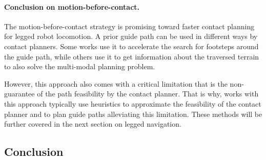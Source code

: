 \paragraph{Conclusion on motion-before-contact.}

The motion-before-contact strategy is promising toward faster contact planning for legged robot locomotion.
A prior guide path can be used in different ways by contact planners. 
Some works use it to accelerate the search for footsteps around the guide path, while others use it to get information about the traversed terrain to also solve the multi-modal planning problem.

However, this approach also comes with a critical limitation that is the non-guarantee of the path feasibility by the contact planner.
That is why, works with this approach typically use heuristics to approximate the feasibility of the contact planner and to plan guide paths alleviating this limitation.
These methods will be further covered in the next section on legged navigation.


\subsection{Conclusion}


